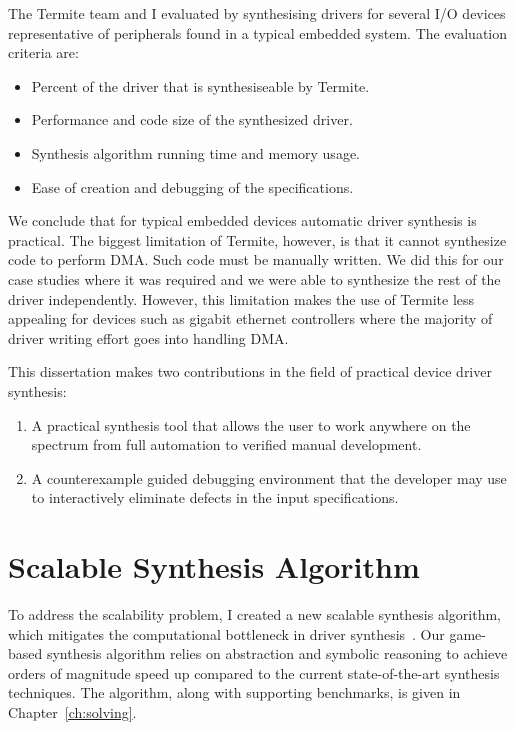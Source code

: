 The Termite team and I evaluated \termite by synthesising drivers for several I/O devices representative of peripherals found in a typical embedded system. The evaluation criteria are:
\begin{itemize}
    \item Percent of the driver that is synthesiseable by Termite.
    \item Performance and code size of the synthesized driver.
    \item Synthesis algorithm running time and memory usage.
    \item Ease of creation and debugging of the specifications.
\end{itemize}

We conclude that for typical embedded devices automatic driver synthesis is practical. The biggest limitation of Termite, however, is that it cannot synthesize code to perform DMA. Such code must be manually written. We did this for our case studies where it was required and we were able to synthesize the rest of the driver independently. However, this limitation makes the use of Termite less appealing for devices such as gigabit ethernet controllers where the majority of driver writing effort goes into handling DMA.

This dissertation makes two contributions in the field of practical device driver synthesis:
\begin{enumerate}
    \item A practical synthesis tool that allows the user to work anywhere on the spectrum from full automation to verified manual development.
    \item A counterexample guided debugging environment that the developer may use to interactively eliminate defects in the input specifications.
\end{enumerate}

\section{Scalable Synthesis Algorithm}
\label{sec:scalable_synth}

To address the scalability problem, I created a new scalable synthesis algorithm, which mitigates the computational bottleneck in driver synthesis~\cite{Walker_Ryzhyk_14}. Our game-based synthesis algorithm relies on abstraction and symbolic reasoning to achieve orders of magnitude speed up compared to the current state-of-the-art synthesis techniques. The algorithm, along with supporting benchmarks, is given in Chapter~\ref{ch:solving}.

